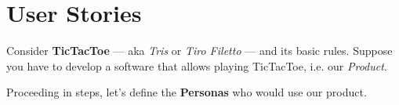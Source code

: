 \chapter{User Stories}

Consider \textbf{TicTacToe} {---} aka \textit{Tris} or \textit{Tiro Filetto} {---} and its basic rules.
Suppose you have to develop a software that allows playing TicTacToe, i.e. our \textit{Product}.

Proceeding in steps, let's define the \textbf{Personas} who would use our product.
